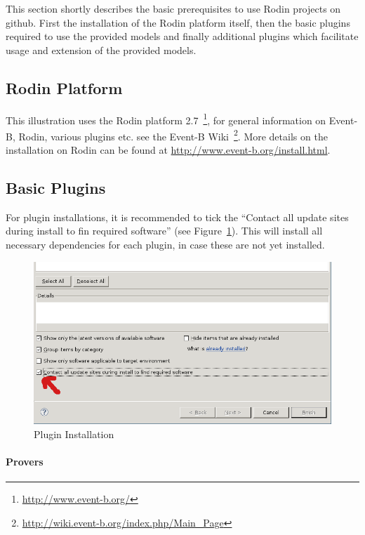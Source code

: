 \documentclass{template/openetcs_article}
\begin{document}
This section shortly describes the basic prerequisites to use Rodin projects on
github. First the installation of the Rodin platform itself, then the basic
plugins required to use the provided models and finally additional plugins which
facilitate usage and extension of the provided models.

\subsection{Rodin Platform}
\label{sec:rodin-platform}

This illustration uses the Rodin platform
2.7~\footnote{\url{http://www.event-b.org/}}, for general information on
Event-B, Rodin, various plugins etc. see the Event-B
Wiki~\footnote{\url{http://wiki.event-b.org/index.php/Main_Page}}. More details
on the installation on Rodin can be found
at {\url{http://www.event-b.org/install.html}}.

\subsection{Basic Plugins}
\label{sec:basic-plugins}

For plugin installations, it is recommended to tick the ``Contact all update
sites during install to fin required software'' (see
Figure~\ref{fig:plugin-install}). This will install all necessary dependencies
for each plugin, in case these are not yet installed.

\begin{figure}[ht]
  \centering
  \includegraphics[width=.75\textwidth]{install-plugin}
  \caption{Plugin Installation}
  \label{fig:plugin-install}
\end{figure}

\paragraph{Provers}
\label{sec:atelier-b-provers}
\end{document}
